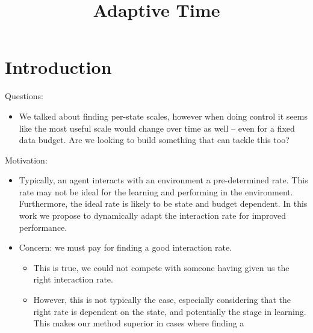 \documentclass[11pt]{article}
\title{Adaptive Time}
\begin{document}
\maketitle

\section{Introduction}

Questions:
\begin{itemize}
    \item We talked about finding per-state scales, however when doing control it seems like the most useful scale would change over time as well -- even for a fixed data budget. Are we looking to build something that can tackle this too?
\end{itemize}


Motivation:
\begin{itemize}
    \item Typically, an agent interacts with an environment a pre-determined rate. This rate may not be ideal for the learning and performing in the environment. Furthermore, the ideal rate is likely to be state and budget dependent. In this work we propose to dynamically adapt the interaction rate for improved performance.
    \item Concern: we must pay for finding a good interaction rate.
    \begin{itemize}
        \item This is true, we could not compete with someone having given us the right interaction rate.
        \item However, this is not typically the case, especially considering that the right rate is dependent on the state, and potentially the stage in learning. This makes our method superior in cases where finding a 
    \end{itemize}

    
\end{itemize}
\end{document}
